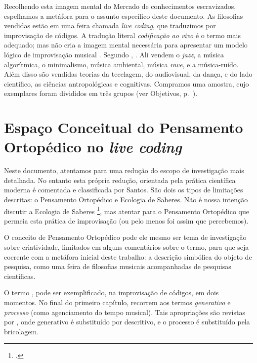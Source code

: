 Recolhendo esta imagem mental do Mercado de conhecimentos escravizados, espelhamos a metáfora para o assunto específico deste documento. As filosofias vendidas estão em uma feira chamada \emph{live coding}, que traduzimos por  improvisação de códigos. A tradução literal \emph{codificação ao vivo} é o termo mais adequado; mas não cria a imagem mental necessária para apresentar um modelo lógico de improvisação musical . Segundo , . Ali vendem o \emph{jazz}, a música algorítmica, o minimalismo, música ambiental, música \emph{rave}, e a música-ruído. Além disso são vendidas teorias da tecelagem, do audiovisual, da dança, e do lado científico, as ciências antropológicas e cognitivas. Compramos uma amostra, cujo exemplares foram divididos em três grupos (ver Objetivos, p.~\pageref{sec:objetivos}).


\section*{Espaço Conceitual do Pensamento Ortopédico no \emph{live coding}}

Neste documento, atentamos para uma redução do escopo de investigação mais detalhada. No entanto esta própria redução, orientada pela prática científica moderna é comentada e classificada por Santos. São dois os tipos de limitações descritas: o Pensamento Ortopédico e Ecologia de Saberes. Não é nossa intenção discutir a Ecologia de Saberes \footnote{.}, mas atentar para o Pensamento Ortopédico que permeia esta prática de improvisação (ou pelo menos foi assim que percebemos). 

O conceito de Pensamento Ortopédico pode ele mesmo ser tema de investigação sobre criatividade, limitados em  alguns comentários sobre o termo, para que seja coerente com a metáfora inicial deste trabalho: a descrição simbólica do objeto de pesquisa, como uma feira de filosofias musicais acompanhadas de pesquisas científicas. 

O termo , pode ser exemplificado, na improvisação de códigos, em dois momentos. No final do primeiro capítulo,  recorrem aos termos \emph{generativo} e \emph{processo} (como agenciamento do tempo musical). Tais apropriações são revistas por , onde generativo é substituído por descritivo, e o processo é substituído pela bricolagem. 

